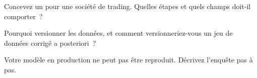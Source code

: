 \begin{interviewq}\label{iq:ml:experiment-tracking-and-reproducibility:4}
Concevez un  pour une société de trading. Quelles étapes et quels champs doit-il comporter~?
\end{interviewq}

\begin{interviewq}\label{iq:ml:experiment-tracking-and-reproducibility:5}
Pourquoi versionner les données, et comment versionneriez-vous un jeu de données corrigé a posteriori~?
\end{interviewq}

\begin{interviewq}\label{iq:ml:experiment-tracking-and-reproducibility:6}
Votre modèle en production ne peut pas être reproduit. Décrivez l'enquête pas à pas.
\end{interviewq}

